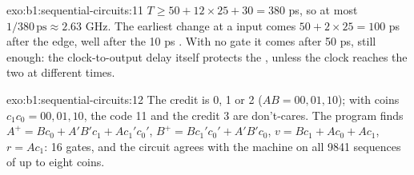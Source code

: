 \begin{solution}{exo:b1:sequential-circuits:11}
$T \geq 50 + 12 \times 25 + 30 = 380$ ps, so at most $1 / 380\,\text{ps} \approx 2.63$ GHz. The earliest change at a
 input comes $50 + 2 \times 25 = 100$ ps after the edge, well after the 10 ps . With no gate it comes
after 50 ps, still enough: the clock-to-output delay itself protects the , unless the clock reaches the two
 at different times.
\end{solution}

\begin{solution}{exo:b1:sequential-circuits:12}
The credit is 0, 1 or 2 ($AB = 00, 01, 10$); with coins $c_1 c_0 = 00, 01, 10$, the code 11 and the credit 3 are
don't-cares. The program finds $A^+ = Bc_0 + A'B'c_1 + Ac_1'c_0'$, $B^+ = Bc_1'c_0' + A'B'c_0$, $v = Bc_1 + Ac_0 + Ac_1$, $r =
Ac_1$: 16 gates, and the circuit agrees with the machine on all 9841 sequences of up to eight coins.
\end{solution}


